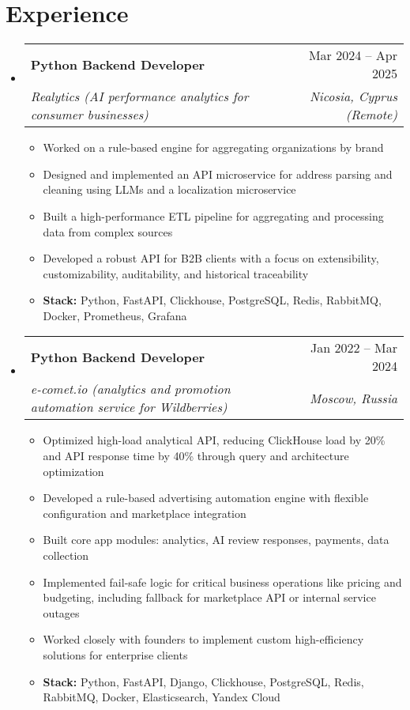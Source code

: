 \documentclass[letterpaper,11pt]{article}
\makeatletter
\newcommand{\resumeItem}[1]{
  \item\small{
    {#1 \vspace{-3pt}}
  }
}
\newcommand{\resumeSubheading}[4]{
  \vspace{-1pt}\item
    \begin{tabular*}{0.97\textwidth}[t]{l@{\extracolsep{\fill}}r}
      \textbf{#1} & #2 \\
      \textit{\small#3} & \textit{\small #4} \\
    \end{tabular*}\vspace{-8pt}
}
\newcommand{\resumeSubHeadingListStart}{\begin{itemize}[leftmargin=0.15in, label={}]}
\newcommand{\resumeSubHeadingListEnd}{\end{itemize}}
\newcommand{\resumeItemListStart}{\begin{itemize}}
\newcommand{\resumeItemListEnd}{\end{itemize}\vspace{-6pt}}
\makeatother
\begin{document}
\section{Experience}
  \resumeSubHeadingListStart
    \resumeSubheading
      {Python Backend Developer}{Mar 2024 -- Apr 2025}
      {Realytics (AI performance analytics for consumer businesses)}{Nicosia, Cyprus (Remote)}
      \resumeItemListStart
        \resumeItem{Worked on a rule-based engine for aggregating organizations by brand}
        \resumeItem{Designed and implemented an API microservice for address parsing and cleaning using LLMs and a localization microservice}
        \resumeItem{Built a high-performance ETL pipeline for aggregating and processing data from complex sources}
        \resumeItem{Developed a robust API for B2B clients with a focus on extensibility, customizability, auditability, and historical traceability}
      \resumeItemListEnd
      \small\vspace{-3pt}\begin{itemize}[leftmargin=0.15in, label={}]
    \item{\textbf{Stack:} Python, FastAPI, Clickhouse, PostgreSQL, Redis, RabbitMQ, Docker, Prometheus, Grafana}
    \end{itemize}
    \vspace{-8pt}
    \resumeSubheading
      {Python Backend Developer}{Jan 2022 -- Mar 2024}
      {e-comet.io (analytics and promotion automation service for Wildberries)}{Moscow, Russia}
      \resumeItemListStart
        \resumeItem{Optimized high-load analytical API, reducing ClickHouse load by 20\% and API response time by 40\% through query and architecture optimization}
        \resumeItem{Developed a rule-based advertising automation engine with flexible configuration and marketplace integration}
        \resumeItem{Built core app modules: analytics, AI review responses, payments, data collection}
        \resumeItem{Implemented fail-safe logic for critical business operations like pricing and budgeting, including fallback for marketplace API or internal service outages}
        \resumeItem{Worked closely with founders to implement custom high-efficiency solutions for enterprise clients}
      \resumeItemListEnd
      \small\vspace{-3pt}\begin{itemize}[leftmargin=0.15in, label={}]
        \item{\textbf{Stack:} Python, FastAPI, Django, Clickhouse, PostgreSQL, Redis, RabbitMQ, Docker, Elasticsearch, Yandex Cloud}
        \end{itemize}
  \resumeSubHeadingListEnd
\end{document}
